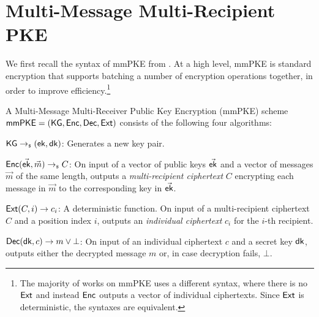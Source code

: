 \section{Multi-Message Multi-Recipient PKE}\label{sec:mmpke}
We first recall the syntax of mmPKE from \cite{PKC:BelBolSta03}. At a high level, mmPKE is standard encryption that
supports batching a number of encryption operations together, in order to improve efficiency.\footnote{The majority of
  works on mmPKE uses a different syntax, where there is no ${\mathsf{Ext}}$ and instead ${\mathsf{Enc}}$ outputs a vector of
  individual ciphertexts. Since ${\mathsf{Ext}}$ is deterministic, the syntaxes are equivalent.}%
%
%
\begin{definition}[\mmPKE]
  A Multi-Message Multi-Receiver Public Key Encryption (mmPKE) scheme ${\mathsf{mmPKE}} = \allowbreak({\mathsf{KG}},\allowbreak {\ensuremath{\mathsf{Enc}}},\allowbreak {\ensuremath{\mathsf{Dec}}}, {\mathsf{Ext}})$ consists of the following four algorithms:
  \begin{description}[align=left, nosep]
  \item[]${\mathsf{KG}} \rightarrow_{\scriptscriptstyle\$} ({\mathsf{ek}}, {\mathsf{dk}})$: Generates a new key pair.
  \item[]${\mathsf{Enc}}(\vec{{\mathsf{ek}}}, \vec{m})\rightarrow_{\scriptscriptstyle\$} C$: On input of a vector of
    public keys $\vec{{\mathsf{ek}}}$ and a vector of messages $\vec{m}$ of the same length, outputs a \emph{multi-recipient ciphertext} $C$ encrypting each message in $\vec{m}$ to the corresponding key in $\vec{{\mathsf{ek}}}$.
  \item[]${\mathsf{Ext}}(C, i)\rightarrow c_i$: A deterministic function. On input of a multi-recipient ciphertext $C$ and a position index $i$, outputs an \emph{individual ciphertext} $c_i$ for the $i$-th recipient.
  \item[]${\mathsf{Dec}}({\mathsf{dk}},c)\rightarrow m\vee\bot$: On input of an individual ciphertext $c$ and a secret key ${\mathsf{dk}}$, outputs either the decrypted message $m$ or, in case decryption fails, $\bot$.
  \end{description}
\end{definition}

